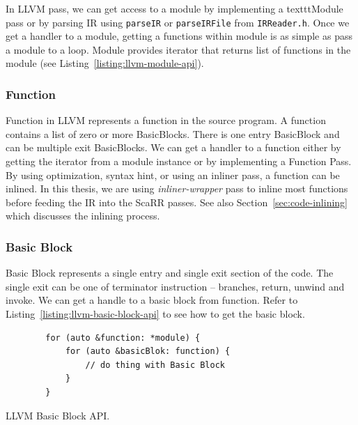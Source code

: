 In LLVM pass, we can get access to a module by implementing a texttt{Module}
pass or by parsing IR using \texttt{parseIR} or \texttt{parseIRFile} from
\texttt{IRReader.h}. Once we get a handler to a module, getting a functions
within module is as simple as pass a module to a loop.  Module provides iterator
that returns list of functions in the module (see
Listing~\ref{listing:llvm-module-api}).


\subsubsection{Function}

Function in LLVM represents a function in the source program. A function
contains a list of zero or more BasicBlocks. There is one entry BasicBlock and
can be multiple exit BasicBlocks. We can get a handler to a function either by
getting the iterator from a module instance or by implementing a Function Pass.
By using optimization, syntax hint, or using an inliner pass, a function can be
inlined. In this thesis, we are using \emph{inliner-wrapper} pass to inline most
functions before feeding the IR into the ScaRR passes. See also
Section~\ref{sec:code-inlining} which discusses the inlining process.

\subsubsection{Basic Block}

Basic Block represents a single entry and single exit section of the code. The
single exit can be one of terminator instruction -- branches, return, unwind and
invoke. We can get a handle to a basic block from function. Refer to
Listing~\ref{listing:llvm-basic-block-api} to see how to get the basic block.

\begin{listing}[htbp]
    \begin{verbatim}
        for (auto &function: *module) {
            for (auto &basicBlok: function) {
                // do thing with Basic Block
            }
        }
    \end{verbatim}
    \caption{LLVM Basic Block API.}    
    \label{listing:llvm-basic-block-api}
\end{listing}

